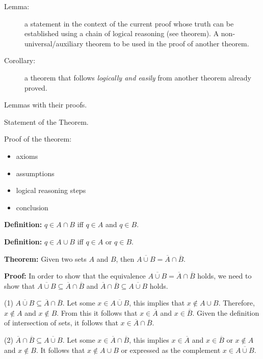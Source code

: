 \documentclass[a4paper,blends,pdf,colorBG,slideColor]{prosper}
\begin{document}

\begin{description}
\item[Lemma:] a statement in the context of the current proof whose truth can be established using a chain of logical reasoning (see theorem).  A non-universal/auxiliary theorem to be used in the proof of another theorem.

\item[Corollary:] a theorem that follows {\em logically and easily} from another theorem already proved.
\end{description}

\es


Lemmas with their proofs.

Statement of the Theorem.

Proof of the theorem:
\begin{itemize}
\item axioms
\item assumptions
\item logical  reasoning steps
\item conclusion
\end{itemize}
\es


{\bf Definition:} $q \in A \cap B$ iff $q\in A$ and $q \in B$.

{\bf Definition:} $q \in A \cup B$ iff $q\in A$ or $q\in B$. 

{\bf Theorem:} Given two sets $A$ and $B$, then $\overline{A \cup B} = \overline{A} \cap \overline{B}$.

{\bf Proof:} In order to show that the equivalence $\overline{A \cup B} = \overline{A} \cap \overline{B}$ holds, we need to show that $\overline{A \cup B} \subseteq \overline{A} \cap \overline{B}$ and
$\overline{A} \cap \overline{B} \subseteq \overline{A \cup B}$ holds.

(1) $\overline{A \cup B} \subseteq \overline{A} \cap \overline{B}$. Let some $x \in \overline{A \cup B} $,
this implies that $x\not\in A \cup B$.  Therefore, $x\not\in A$ and $x\not\in B$.  From this it follows
that $x\in \overline{A}$ and $x\in\overline{B}$.  Given the definition of intersection of sets, it follows
that $x \in \overline{A} \cap \overline{B}$.

(2) $\overline{A} \cap \overline{B} \subseteq \overline{A \cup B}$. Let some $x \in \overline{A} \cap \overline{B}$, this implies $x \in \overline{A}$ and $x \in \overline{B}$ or $x\not\in A$ and $x\not\in B$.
It follows that $x \not\in A\cup B$ or expressed as the complement $x \in \overline{A \cup B}$.
\end{document}
